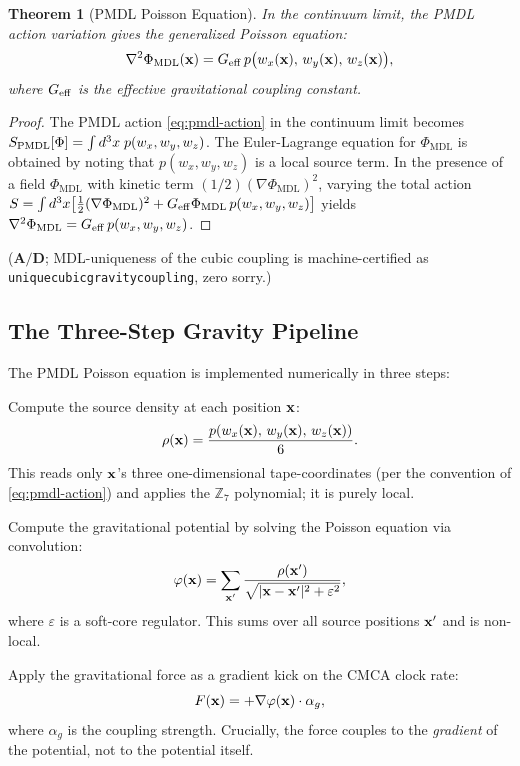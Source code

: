 \documentclass[11pt]{article}
\newtheorem{theorem}{Theorem}[section]
\theoremstyle{remark}
\newcommand{\PHIMDL}{\Phi_{\mathrm{MDL}}}
\newcommand{\ZS}{\mathbb{Z}_7}
\newcommand{\lean}[1]{%
  \penalty-100
  \begingroup\def\_{\textunderscore\allowbreak}\texttt{#1}\endgroup}
\newcommand{\CatAD}{\textbf{A/D}}
\newcommand{\CMCA}{\text{CMCA}}
\newcommand{\PMDL}{S_{\rm PMDL}}
\begin{document}
\begin{theorem}[PMDL Poisson Equation]
\label{thm:pmdl-poisson}
In the continuum limit, the PMDL action variation gives the generalized
Poisson equation:
\begin{equation}
  \nabla^2 \PHIMDL({\bf x}) = G_{\rm eff}\,
  p\bigl(w_x({\bf x}),\, w_y({\bf x}),\, w_z({\bf x})\bigr),
  \label{eq:pmdl-poisson}
\end{equation}
where $G_{\rm eff}$ is the effective gravitational coupling constant.
\end{theorem}
\begin{proof}
The PMDL action \eqref{eq:pmdl-action} in the continuum limit becomes
$\PMDL[\Phi] = \int d^3x\; p(w_x,w_y,w_z)$. The Euler-Lagrange equation
for $\PHIMDL$ is obtained by noting that $p(w_x,w_y,w_z)$ is a local
source term. In the presence of a field $\PHIMDL$ with kinetic term
$(1/2)(\nabla\PHIMDL)^2$, varying the total action
$S = \int d^3x \bigl[\tfrac{1}{2}(\nabla\PHIMDL)^2 +
G_{\rm eff}\PHIMDL\, p(w_x,w_y,w_z)\bigr]$
yields $\nabla^2\PHIMDL = G_{\rm eff}\,p(w_x,w_y,w_z)$.
\end{proof}
($\CatAD$; MDL-uniqueness of the cubic coupling is machine-certified as
\lean{unique\_cubic\_gravity\_coupling}, zero sorry.)

\subsection{The Three-Step Gravity Pipeline}

The PMDL Poisson equation is implemented numerically in three steps:

\begin{description}[leftmargin=1.5cm]
  \item[Step A (Local):] Compute the source density at each position ${\bf x}$:
        \[
          \rho({\bf x}) = \frac{p(w_x({\bf x}),\, w_y({\bf x}),\,
          w_z({\bf x}))}{6}.
        \]
        This reads only ${\bf x}$'s three one-dimensional tape-coordinates (per the
        convention of \eqref{eq:pmdl-action}) and applies the $\ZS$ polynomial;
        it is purely local.

  \item[Step B (Non-local):] Compute the gravitational potential by solving
        the Poisson equation via convolution:
        \[
          \varphi({\bf x}) = \sum_{{\bf x}'} \frac{\rho({\bf x}')}{
          \sqrt{|{\bf x} - {\bf x}'|^2 + \varepsilon^2}},
        \]
        where $\varepsilon$ is a soft-core regulator. This sums over all
        source positions ${\bf x}'$ and is non-local.

  \item[Step C (Gradient kick):] Apply the gravitational force as a gradient
        kick on the $\CMCA$ clock rate:
        \[
          F({\bf x}) = +\nabla\varphi({\bf x}) \cdot \alpha_g,
        \]
        where $\alpha_g$ is the coupling strength. Crucially, the force
        couples to the \emph{gradient} of the potential, not to the
        potential itself.
\end{description}
\end{document}

